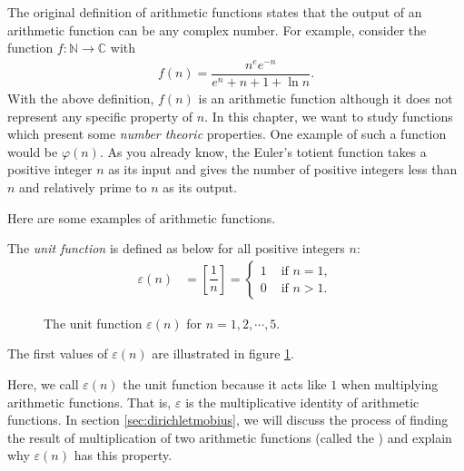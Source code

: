 \documentclass[12pt]{subfile}
\begin{document}
		\begin{remark}
			The original definition of arithmetic functions states that the output of an arithmetic function can be any complex number. For example, consider the function $f:\mathbb{N}\to \mathbb{C}$ with
				\begin{align*}
					f(n)=\dfrac{n^ee^{-n}}{e^n+n+1+\ln n}.
				\end{align*}
			With the above definition, $f(n)$ is an arithmetic function although it does not represent any specific property of $n$. In this chapter, we want to study functions which present some \textit{number theoric} properties. One example of such a function would be $\varphi(n)$. As you already know, the Euler's totient function takes a positive integer $n$ as its input and gives the number of positive integers less than $n$ and relatively prime to $n$ as its output.
		\end{remark}
	Here are some examples of arithmetic functions.
		\begin{definition}
			The \textit{unit function} is defined as below for all positive integers $n$:
				\begin{align*}
					\varepsilon(n) & =\left[\dfrac 1n\right] =\begin{cases}1&\mbox{ if }n=1,\\0&\mbox{ if }n>1.\end{cases}
				\end{align*}

			\begin{figure}
			\centering
			\caption{The unit function $\varepsilon(n)$ for $n=1,2,\cdots,5$.}
			\label{fig:unitfunction}
		\end{figure}
			The first values of $\varepsilon(n)$ are illustrated in figure \ref{fig:unitfunction}.
		\end{definition}

		\begin{note}
			Here, we call $\varepsilon(n)$ the unit function because it acts like $1$ when multiplying arithmetic functions. That is, $\varepsilon$ is the multiplicative identity of arithmetic functions. In section \ref{sec:dirichletmobius}, we will discuss the process of finding the result of multiplication of two arithmetic functions (called the ) and explain why $\varepsilon(n)$ has this property.
		\end{note}
\end{document}

